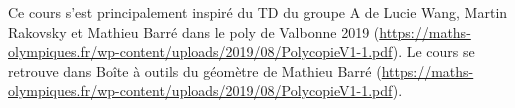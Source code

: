 Ce cours s'est principalement inspiré du TD du groupe A de Lucie Wang, Martin Rakovsky et Mathieu Barré dans le poly de Valbonne 2019 (\url{https://maths-olympiques.fr/wp-content/uploads/2019/08/PolycopieV1-1.pdf}). Le cours se retrouve dans Boîte à outils du géomètre de Mathieu Barré (\url{https://maths-olympiques.fr/wp-content/uploads/2019/08/PolycopieV1-1.pdf}).